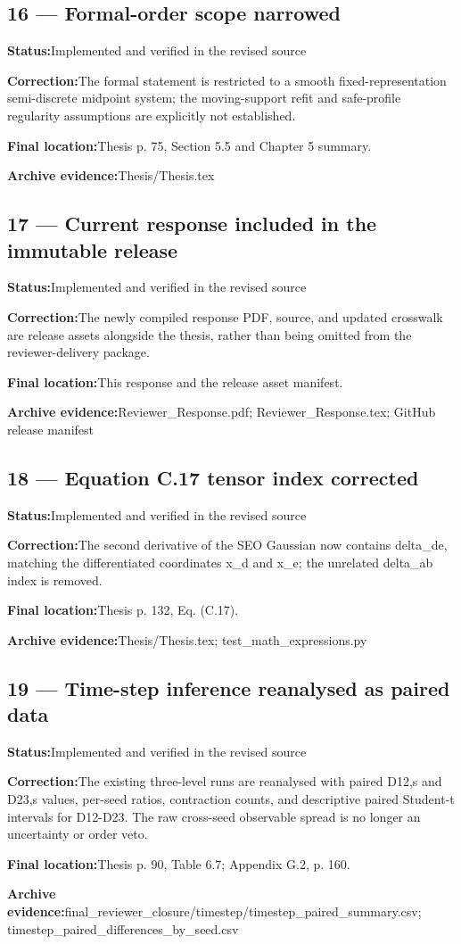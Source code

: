 \documentclass[11pt]{article}
\newcommand{\field}[2]{\textbf{#1}\quad #2\par}
\begin{document}
\subsection*{16 --- Formal-order scope narrowed}
\field{Status:}{Implemented and verified in the revised source}
\field{Correction:}{The formal statement is restricted to a smooth fixed-representation semi-discrete midpoint system; the moving-support refit and safe-profile regularity assumptions are explicitly not established.}
\field{Final location:}{Thesis p. 75, Section 5.5 and Chapter 5 summary.}
\field{Archive evidence:}{Thesis/Thesis.tex}
\subsection*{17 --- Current response included in the immutable release}
\field{Status:}{Implemented and verified in the revised source}
\field{Correction:}{The newly compiled response PDF, source, and updated crosswalk are release assets alongside the thesis, rather than being omitted from the reviewer-delivery package.}
\field{Final location:}{This response and the release asset manifest.}
\field{Archive evidence:}{Reviewer\_Response.pdf; Reviewer\_Response.tex; GitHub release manifest}
\subsection*{18 --- Equation C.17 tensor index corrected}
\field{Status:}{Implemented and verified in the revised source}
\field{Correction:}{The second derivative of the SEO Gaussian now contains delta\_de, matching the differentiated coordinates x\_d and x\_e; the unrelated delta\_ab index is removed.}
\field{Final location:}{Thesis p. 132, Eq. (C.17).}
\field{Archive evidence:}{Thesis/Thesis.tex; test\_math\_expressions.py}
\subsection*{19 --- Time-step inference reanalysed as paired data}
\field{Status:}{Implemented and verified in the revised source}
\field{Correction:}{The existing three-level runs are reanalysed with paired D12,s and D23,s values, per-seed ratios, contraction counts, and descriptive paired Student-t intervals for D12-D23. The raw cross-seed observable spread is no longer an uncertainty or order veto.}
\field{Final location:}{Thesis p. 90, Table 6.7; Appendix G.2, p. 160.}
\field{Archive evidence:}{final\_reviewer\_closure/timestep/timestep\_paired\_summary.csv; timestep\_paired\_differences\_by\_seed.csv}
\end{document}
